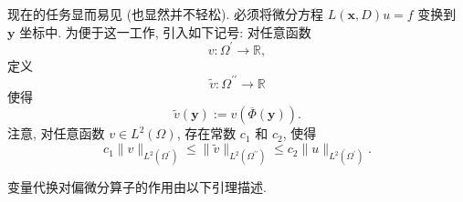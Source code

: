 现在的任务显而易见 (也显然并不轻松). 必须将微分方程 $L(\bm{x},D)u=f$ 变换到 $\bm{y}$ 坐标中. 为便于这一工作, 引入如下记号: 对任意函数\[v:\Omega^{\prime}\to\mathbb{R},\]定义
\begin{equation}\label{eq:boundary-coordinate-transformed-function-domain}
\widetilde v:\Omega^{\prime\prime}\to\mathbb{R}
\end{equation}
使得
\begin{equation}\label{eq:boundary-coordinate-transformed-function-definition}
\widetilde v(\bm{y}):=v(\overline\Phi(\bm{y})).
\end{equation}
注意, 对任意函数 $v\in L^2(\Omega)$, 存在常数 $c_1$ 和 $c_2$, 使得
\begin{equation}\label{eq:boundary-coordinate-l2-norm-comparison}
c_1\|v\|_{L^2(\Omega^{\prime})}\leq\|\widetilde v\|_{L^2(\Omega^{\prime\prime})}\leq c_2\|u\|_{L^2(\Omega^{\prime})}.
\end{equation}


变量代换对偏微分算子的作用由以下引理描述.

